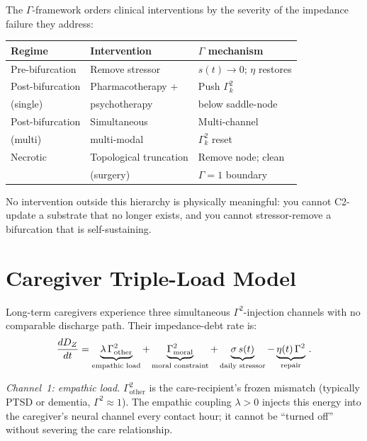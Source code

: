 \documentclass[aps,pre,twocolumn,superscriptaddress,floatfix]{revtex4-2}
\begin{document}
\begin{remark}
\label{rem:therapeutic-hierarchy}
The $\Gamma$-framework orders clinical
interventions by the severity of the impedance
failure they address:
\begin{center}
\begin{tabular}{@{}lll@{}}
\toprule
\textbf{Regime} & \textbf{Intervention} &
  \textbf{$\Gamma$ mechanism} \\
\midrule
Pre-bifurcation & Remove stressor &
  $s(t) \to 0$; $\eta$ restores \\
Post-bifurcation & Pharmacotherapy + &
  Push $\Gamma_k^2$ \\
\quad (single) & \quad psychotherapy &
  below saddle-node \\
Post-bifurcation & Simultaneous &
  Multi-channel \\
\quad (multi) & \quad multi-modal &
  $\Gamma_k^2$ reset \\
Necrotic & Topological truncation &
  Remove node; clean \\
 & \quad (surgery) &
  $\Gamma{=}1$ boundary \\
\bottomrule
\end{tabular}
\end{center}
No intervention outside this hierarchy is
physically meaningful: you cannot C2-update a
substrate that no longer exists, and you cannot
stressor-remove a bifurcation that is
self-sustaining.
\end{remark}


\section{Caregiver Triple-Load Model}
\label{sec:triple-load}

Long-term caregivers experience three simultaneous
$\Gamma^2$-injection channels with no comparable
discharge path.
Their impedance-debt rate is:
\begin{equation}
  \frac{dD_Z}{dt}
  = \underbrace{\lambda\,\Gamma_{\text{other}}^2}_{%
    \text{empathic load}}
  + \underbrace{\Gamma_{\text{moral}}^2}_{%
    \text{moral constraint}}
  + \underbrace{\sigma\,s(t)}_{\text{daily stressor}}
  - \underbrace{\eta(t)\,\Gamma^2}_{\text{repair}}\,.
  \label{eq:triple-load}
\end{equation}

\emph{Channel~1: empathic load.}
$\Gamma_{\text{other}}^2$ is the care-recipient's
frozen mismatch (typically PTSD or dementia,
$\Gamma^2\!\approx\!1$).
The empathic coupling $\lambda>0$ injects this
energy into the caregiver's neural channel
every contact hour; it cannot be ``turned off''
without severing the care relationship.
\end{document}
